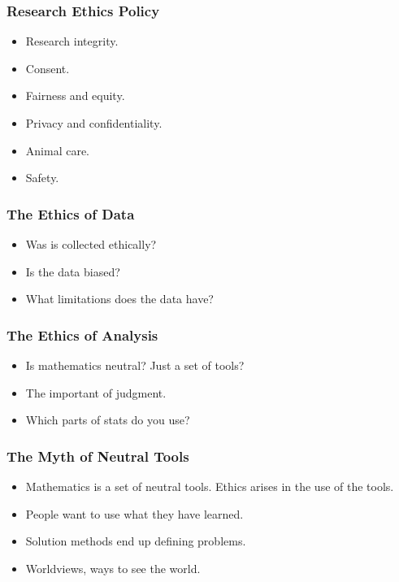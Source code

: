 \documentclass{beamer}
\begin{document}
\begin{frame}
  \frametitle{ Research Ethics Policy}
  \begin{itemize}
    \item[] 
      Research integrity.
      \vspace{0.5cm}
    \item[] 
      Consent.
      \vspace{0.5cm}
    \item[] 
      Fairness and equity. 
      \vspace{0.5cm}
    \item[] 
      Privacy and confidentiality.
      \vspace{0.5cm}
    \item[] 
      Animal care.
      \vspace{0.5cm}
    \item[] 
      Safety.
  \end{itemize}
\end{frame}


\begin{frame}
  \frametitle{The Ethics of Data}
  \begin{itemize}
    \item[] 
      Was is collected ethically?
      \vspace{0.5cm}
    \item[] 
      Is the data biased?
      \vspace{0.5cm}
    \item[] 
      What limitations does the data have?
  \end{itemize}
\end{frame}

\begin{frame}
  \frametitle{The Ethics of Analysis}
  \begin{itemize}
    \item[] 
      Is mathematics neutral? Just a set of tools?
      \vspace{0.5cm}
    \item[] 
      The important of judgment.
      \vspace{0.5cm}
    \item[] 
      Which parts of stats do you use?
  \end{itemize}
\end{frame}

\begin{frame}
  \frametitle{The Myth of Neutral Tools}
  \begin{itemize}
    \item[] 
      Mathematics is a set of neutral tools. Ethics arises in the use
      of the tools. 
      \vspace{0.5cm}
    \item[] 
      People want to use what they have learned. 
      \vspace{0.5cm}
    \item[] 
      Solution methods end up defining problems. 
      \vspace{0.5cm}
    \item[] 
      Worldviews, ways to see the world. 
  \end{itemize}
\end{frame}
\end{document}
